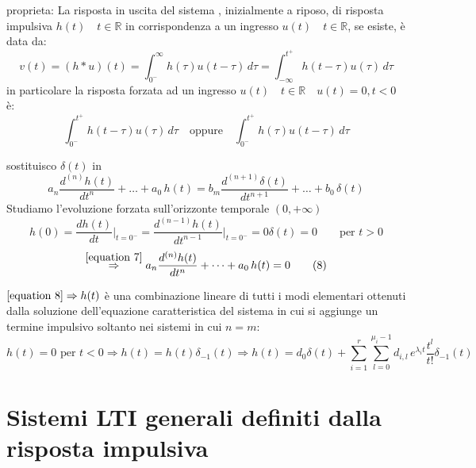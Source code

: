proprieta:
La risposta in uscita del sistema%
, inizialmente a riposo, di risposta impulsiva $h(t)\quad t\in\mathbb{R}$ in corrispondenza a un ingresso $u(t)\quad t\in\mathbb{R}$, se esiste, è data da:
\[
v(t)=(h*u)(t) = \int_{0^-}^{\infty}h(\tau)u(t - \tau)\,d\tau
= \int_{-\infty}^{t^+}h(t - \tau)u(\tau)\,d\tau
\]
in particolare la risposta forzata ad un ingresso $u(t)\quad t\in\mathbb{R} \quad u(t)=0 , t<0$ è:
\[
\int_{0^-}^{t^+}h(t - \tau)u(\tau)\,d\tau 
\quad\text{oppure}\quad
\int_{0^-}^{t^+}h(\tau)u(t - \tau)\,d\tau 
\]

sostituisco $\delta (t)$ in %
\begin{equation}
	a_n \frac{d^{(n)} h(t)}{dt^n}+\dots+a_0\,h(t) = b_m \frac{d^{(n+1)} \delta(t)}{dt^{n+1}}+\dots+b_0\,\delta(t) %
	\tag{7}\label{equation 7}
\end{equation}
Studiamo l'evoluzione forzata sull'orizzonte temporale $(0,+\infty)$ %
\[ %
	h(0) = \frac{dh(t)}{dt}\bigg\vert_{t=0^-}
	=\frac{d^{(n-1)}h(t)}{dt^{n-1}}\bigg\vert_{t=0^-}
	= 0
	\delta(t) = 0 \qquad\text{per } t>0
\]
\begin{equation}
	\overset{\eqref{equation 7}}{\Rightarrow}a_n \frac{d^{(n)} h(t)}{dt^n}+\dots+a_0\,h(t) = 0 
	\tag{8}\label{equation 8}
\end{equation}
	
\begin{osservazione}
	$\eqref{equation 8} \Rightarrow h (t)$ è una combinazione lineare di tutti i modi elementari ottenuti dalla soluzione dell'equazione caratteristica del sistema%
	in cui si aggiunge un termine impulsivo soltanto nei sistemi in cui $n=m$:
	\begin{equation}
		h(t)=0 \text{ per } t<0 \Rightarrow h(t) = h(t)\delta_{-1} (t)
		\Rightarrow h(t)= d_0 \delta(t) + \sum_{i=1}^{r}\sum_{l=0}^{\mu_i-1}d_{i,l} \,e^{\lambda_it}\frac{t^l}{t!}\delta_{-1} (t)
		\tag{9}\label{equation 9}
	\end{equation}
\end{osservazione}



\section{Sistemi LTI generali definiti dalla risposta impulsiva}

